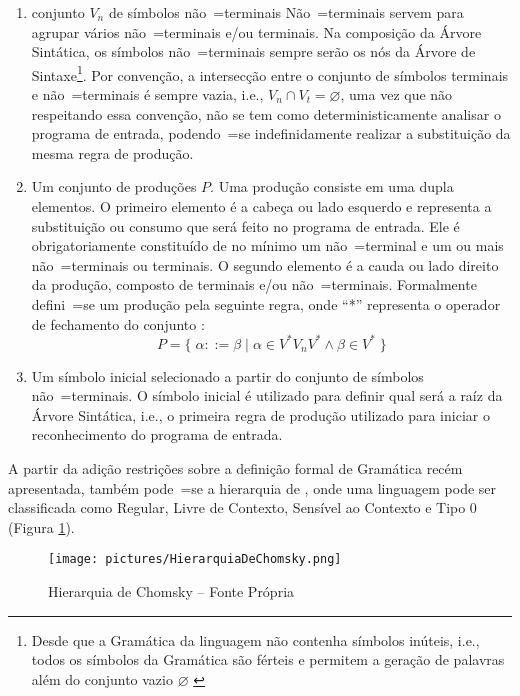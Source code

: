 {\begin{enumerate}
        \item {} conjunto $V_n$ de símbolos
        não~=terminais
        Não~=terminais servem para agrupar vários não~=terminais e\slash{}ou terminais.
        Na composição da Árvore Sintática,
        os símbolos não~=terminais sempre serão os nós da Árvore de Sintaxe\footnote{Desde
        que a Gramática da linguagem não contenha símbolos inúteis,
        i.e.,
        todos os símbolos da Gramática são férteis e
        permitem a geração de palavras além do conjunto vazio $\varnothing$ \cite{hopcroftBook}}.
        Por convenção,
        a intersecção entre o conjunto de símbolos terminais e
        não~=terminais é sempre vazia,
        i.e.,
        $V_n \cap V_t = \varnothing$,
        uma vez que não respeitando essa convenção,
        não se tem como deterministicamente analisar o programa de entrada,
        podendo~=se indefinidamente realizar a substituição da mesma regra de produção.

        \item \label{definicaoDeGramatica}Um conjunto de produções $P$.
        Uma produção consiste em uma dupla elementos.
        O primeiro elemento é a cabeça ou lado esquerdo e
        representa a substituição ou consumo que será feito no programa de entrada.
        Ele é obrigatoriamente constituído de no mínimo um não~=terminal e
        um ou mais não~=terminais ou terminais.
        O segundo elemento é a cauda ou lado direito da produção,
        composto de terminais e\slash{}ou não~=terminais.
        Formalmente defini~=se um produção pela seguinte regra,
        onde ``*'' representa o operador de fechamento do conjunto \cite{hopcroftBook}:
        $$P = \{\; \alpha ::= \beta \;|\; \alpha \in V^* V_n V^* \land \beta \in V^* \;\}$$

        \item Um símbolo inicial selecionado a partir do conjunto de símbolos não~=terminais.
        O símbolo inicial é utilizado para definir qual será a raíz da Árvore Sintática,
        i.e.,
        o primeira regra de produção utilizado para iniciar o reconhecimento do programa de entrada.
    \end{enumerate}

    A partir da adição restrições sobre a definição formal de Gramática recém apresentada,
    também pode~=se  a hierarquia de
    ,
    onde uma linguagem pode ser classificada como Regular,
    Livre de Contexto,
    Sensível ao Contexto e
    Tipo 0 (Figura \ref{fig:pictures/HierarquiaDeChomsky.png}).
    \begin{figure}[H]
    \centering
    \texttt{[image: pictures/HierarquiaDeChomsky.png]}
    \caption{Hierarquia de Chomsky -- Fonte Própria }
    \label{fig:pictures/HierarquiaDeChomsky.png}
    \end{figure}

}
